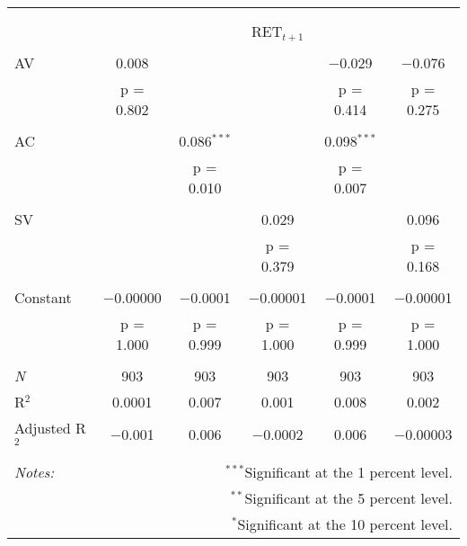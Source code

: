 
\begin{tabular}{@{\extracolsep{5pt}}lccccc} 
\\[-1.8ex]\hline 
\hline \\[-1.8ex] 
\\[-1.8ex] & \multicolumn{5}{c}{RET$_{t+1}$} \\ 
\hline \\[-1.8ex] 
 AV & 0.008 &  &  & $-$0.029 & $-$0.076 \\ 
  & p = 0.802 &  &  & p = 0.414 & p = 0.275 \\ 
  & & & & & \\ 
 AC &  & 0.086$^{***}$ &  & 0.098$^{***}$ &  \\ 
  &  & p = 0.010 &  & p = 0.007 &  \\ 
  & & & & & \\ 
 SV &  &  & 0.029 &  & 0.096 \\ 
  &  &  & p = 0.379 &  & p = 0.168 \\ 
  & & & & & \\ 
 Constant & $-$0.00000 & $-$0.0001 & $-$0.00001 & $-$0.0001 & $-$0.00001 \\ 
  & p = 1.000 & p = 0.999 & p = 1.000 & p = 0.999 & p = 1.000 \\ 
  & & & & & \\ 
\textit{N} & 903 & 903 & 903 & 903 & 903 \\ 
R$^{2}$ & 0.0001 & 0.007 & 0.001 & 0.008 & 0.002 \\ 
Adjusted R$^{2}$ & $-$0.001 & 0.006 & $-$0.0002 & 0.006 & $-$0.00003 \\ 
\hline 
\hline \\[-1.8ex] 
\textit{Notes:} & \multicolumn{5}{r}{$^{***}$Significant at the 1 percent level.} \\ 
 & \multicolumn{5}{r}{$^{**}$Significant at the 5 percent level.} \\ 
 & \multicolumn{5}{r}{$^{*}$Significant at the 10 percent level.} \\ 
\end{tabular} 
